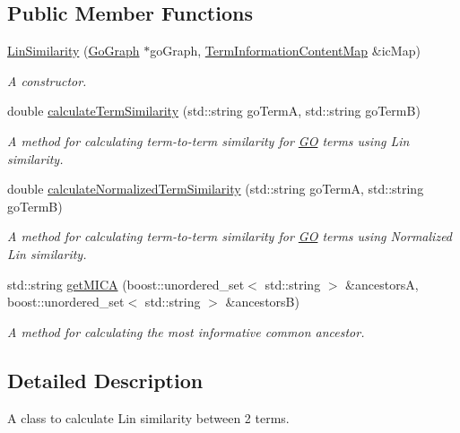 \subsection*{Public Member Functions}
\begin{DoxyCompactItemize}
\item 
\hyperlink{classLinSimilarity_a44739dba8ae706d5248615bd9df9cc31}{Lin\+Similarity} (\hyperlink{classGoGraph}{Go\+Graph} $\ast$go\+Graph, \hyperlink{classTermInformationContentMap}{Term\+Information\+Content\+Map} \&ic\+Map)
\begin{DoxyCompactList}\small\item\em A constructor. \end{DoxyCompactList}\item 
double \hyperlink{classLinSimilarity_a55d2d8bd6aea6fc3e9b0920f05828a15}{calculate\+Term\+Similarity} (std\+::string go\+TermA, std\+::string go\+TermB)
\begin{DoxyCompactList}\small\item\em A method for calculating term-\/to-\/term similarity for \hyperlink{namespaceGO}{GO} terms using Lin similarity. \end{DoxyCompactList}\item 
double \hyperlink{classLinSimilarity_a576df5bf234556e57e2ddcfda3d73b93}{calculate\+Normalized\+Term\+Similarity} (std\+::string go\+TermA, std\+::string go\+TermB)
\begin{DoxyCompactList}\small\item\em A method for calculating term-\/to-\/term similarity for \hyperlink{namespaceGO}{GO} terms using Normalized Lin similarity. \end{DoxyCompactList}\item 
std\+::string \hyperlink{classLinSimilarity_ab2e39eac3cf61be4e1b44b988fa6f490}{get\+M\+I\+CA} (boost\+::unordered\+\_\+set$<$ std\+::string $>$ \&ancestorsA, boost\+::unordered\+\_\+set$<$ std\+::string $>$ \&ancestorsB)
\begin{DoxyCompactList}\small\item\em A method for calculating the most informative common ancestor. \end{DoxyCompactList}\end{DoxyCompactItemize}


\subsection{Detailed Description}
A class to calculate Lin similarity between 2 terms. 


